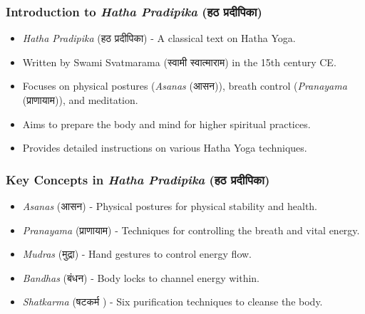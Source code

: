 \begin{frame}[fragile]\frametitle{Introduction to \textit{Hatha Pradipika} (हठ प्रदीपिका)}

      \begin{itemize}
		\item \textit{Hatha Pradipika} (हठ प्रदीपिका) - A classical text on Hatha Yoga.
		\item Written by Swami Svatmarama (स्वामी स्वात्माराम) in the 15th century CE.
		\item Focuses on physical postures (\textit{Asanas} (आसन)), breath control (\textit{Pranayama} (प्राणायाम)), and meditation.
		\item Aims to prepare the body and mind for higher spiritual practices.
		\item Provides detailed instructions on various Hatha Yoga techniques.
	  \end{itemize}

\end{frame}

\begin{frame}[fragile]\frametitle{Key Concepts in \textit{Hatha Pradipika} (हठ प्रदीपिका)}

      \begin{itemize}
		\item \textit{Asanas} (आसन) - Physical postures for physical stability and health.
		\item \textit{Pranayama} (प्राणायाम) - Techniques for controlling the breath and vital energy.
		\item \textit{Mudras} (मुद्रा) - Hand gestures to control energy flow.
		\item \textit{Bandhas} (बंधन) - Body locks to channel energy within.
		\item \textit{Shatkarma} (षटकर्म ) - Six purification techniques to cleanse the body.
	  \end{itemize}

\end{frame}

